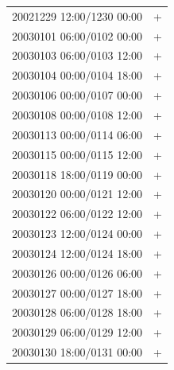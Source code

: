 \documentclass[draft]{agujournal2019}
\begin{document}
\begin{center}
\begin{longtable}{lc}
20021229 12:00/1230 00:00 & + \\
20030101 06:00/0102 00:00 & + \\
20030103 06:00/0103 12:00 & + \\
20030104 00:00/0104 18:00 & + \\
20030106 00:00/0107 00:00 & + \\
20030108 00:00/0108 12:00 & + \\
20030113 00:00/0114 06:00 & + \\
20030115 00:00/0115 12:00 & + \\
20030118 18:00/0119 00:00 & + \\
20030120 00:00/0121 12:00 & + \\
20030122 06:00/0122 12:00 & + \\
20030123 12:00/0124 00:00 & + \\
20030124 12:00/0124 18:00 & + \\
20030126 00:00/0126 06:00 & + \\
20030127 00:00/0127 18:00 & + \\
20030128 06:00/0128 18:00 & + \\
20030129 06:00/0129 12:00 & + \\
20030130 18:00/0131 00:00 & + \\
\hline
\end{longtable}
\end{center}

\pagebreak
\end{document}
